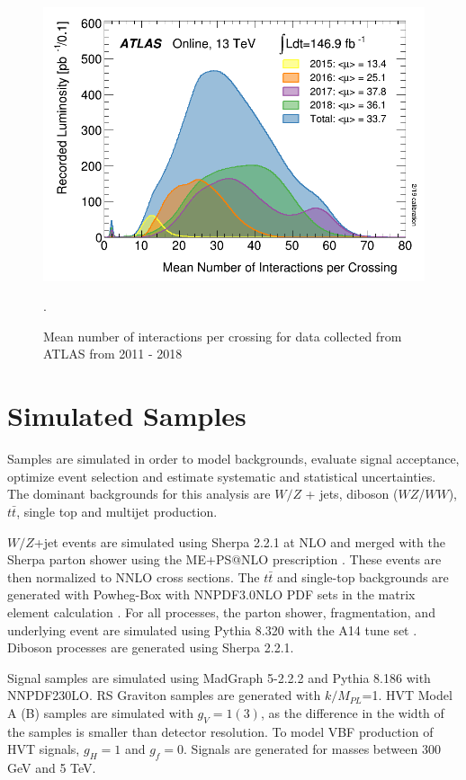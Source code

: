 \begin{figure}[h!]
  \centering
  \includegraphics[width=\hsize]{figures/Analysis/mu_profile.png}
  \caption{Mean number of interactions per crossing for data collected from ATLAS from 2011 - 2018}. 
  \label{fig:mu_profile}
\end{figure} 
\FloatBarrier


\section{Simulated Samples}
\label{Simulated Samples}
Samples are simulated in order to model backgrounds, evaluate signal acceptance, optimize event selection and estimate systematic and statistical uncertainties. The dominant backgrounds for this analysis are $W/Z$ + jets, diboson ($WZ$/$WW$), $t\bar{t}$, single top and multijet production. 

$W/Z$+jet events are simulated using Sherpa 2.2.1 at NLO \cite{sherpa} and merged with the Sherpa parton shower using the ME+PS@NLO prescription \cite{me_ps}. These events are then normalized to NNLO cross sections. The $t\bar{t}$ and single-top backgrounds are generated with Powheg-Box with NNPDF3.0NLO PDF sets in the matrix element calculation \cite{pdfsets}. For all processes, the parton shower, fragmentation, and underlying event are simulated using Pythia 8.320 with the A14 tune set \cite{pdfsets}. Diboson processes are generated using Sherpa 2.2.1. 

Signal samples are simulated using MadGraph 5-2.2.2 \cite{nnlo} and Pythia 8.186 with NNPDF230LO. RS Graviton samples are generated with $k/M_{PL}$=1. HVT Model A (B) samples are simulated with $g_{V}=1(3)$, as the difference in the width of the samples is smaller than detector resolution. To model VBF production of HVT signals, $g_{H}=1$ and $g_{f}=0$. Signals are generated for masses between 300 GeV and 5 TeV.

